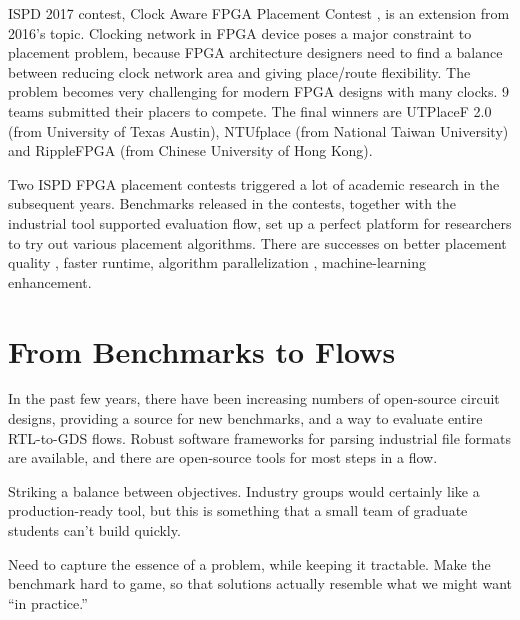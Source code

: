 \documentclass[sigconf]{acmart}
\begin{document}
ISPD 2017 contest, Clock Aware FPGA Placement Contest\cite{sy5} , is an
extension from 2016’s topic. Clocking network in FPGA device poses a
major constraint to placement problem, because FPGA architecture
designers need to find a balance between reducing clock network area
and giving place/route flexibility. The problem becomes very
challenging for modern FPGA designs with many clocks. 9 teams
submitted their placers to compete. The final winners are UTPlaceF 2.0
\cite{sy6} (from University of Texas Austin), NTUfplace\cite{sy7} (from National
Taiwan University) and RippleFPGA\cite{sy8}  (from Chinese University of Hong
Kong).

Two ISPD FPGA placement contests triggered a lot of academic research
in the subsequent years. Benchmarks released in the contests, together
with the industrial tool supported evaluation flow, set up a perfect
platform for researchers to try out various placement
algorithms. There are successes on better placement quality\cite{sy9} ,
faster runtime, algorithm parallelization\cite{sy10,sy11} , machine-learning
enhancement\cite{sy12}.



\iffalse
\subsection{Deep Learning Accelerator Placement, 2020}

Include this?  Not really placement, but placement-ish?
\fi


\section{From Benchmarks to Flows}

In the past few years, there have been increasing
numbers of open-source circuit designs,
providing a source 
for new benchmarks, and a way to evaluate entire
RTL-to-GDS flows.  Robust software frameworks for
parsing industrial file formats are available,
and there are open-source tools for most steps
in a flow.

\iffalse

Striking a balance between objectives.  Industry groups
would certainly like a production-ready tool, but this is
something that a small team of graduate students can't
build quickly.

Need to capture the essence of a problem, while keeping it
tractable.  Make the benchmark hard to game, so that solutions
actually resemble what we might want ``in practice.''
\end{document}
